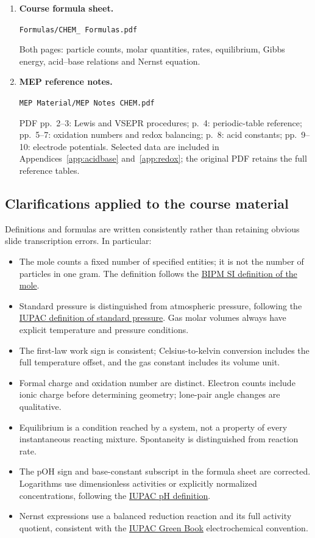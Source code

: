 \documentclass[a4paper,10pt]{article}
\begin{document}
\begin{enumerate}
  Theory on PDF pp.~5--8, 10--14 and 16--23; supports
  Sections~\ref{sec:reactions}--\ref{sec:equilibrium}. Exercise prompts and
  worked exercise tasks are omitted, including those sharing theory pages.
  \item \textbf{Course formula sheet.}\par
  \nolinkurl{Formulas/CHEM_ Formulas.pdf}\par
  Both pages: particle counts, molar quantities, rates, equilibrium, Gibbs energy,
  acid--base relations and Nernst equation.
  \item \textbf{MEP reference notes.}\par
  \nolinkurl{MEP Material/MEP Notes CHEM.pdf}\par
  PDF pp.~2--3: Lewis and VSEPR procedures; p.~4: periodic-table reference;
  pp.~5--7: oxidation numbers and redox balancing; p.~8: acid constants;
  pp.~9--10: electrode potentials. Selected data are included in
  Appendices~\ref{app:acidbase} and~\ref{app:redox}; the original PDF retains
  the full reference tables.
\end{enumerate}
\endgroup

\subsection*{Clarifications applied to the course material}
Definitions and formulas are written consistently rather than retaining obvious
slide transcription errors. In particular:
\begin{itemize}
  \item The mole counts a fixed number of specified entities; it is not the
  number of particles in one gram. The definition follows the
  \href{https://www.bipm.org/en/si-base-units/mole}{BIPM SI definition of the mole}.
  \item Standard pressure is distinguished from atmospheric pressure, following
  the \href{https://goldbook.iupac.org/terms/view/S05921}{IUPAC definition of standard pressure}.
  Gas molar volumes always have explicit temperature and pressure conditions.
  \item The first-law work sign is consistent; Celsius-to-kelvin conversion
  includes the full temperature offset, and the gas constant includes its volume unit.
  \item Formal charge and oxidation number are distinct. Electron counts include
  ionic charge before determining geometry; lone-pair angle changes are qualitative.
  \item Equilibrium is a condition reached by a system, not a property of every
  instantaneous reacting mixture. Spontaneity is distinguished from reaction rate.
  \item The pOH sign and base-constant subscript in the formula sheet are corrected.
  Logarithms use dimensionless activities or explicitly normalized concentrations,
  following the \href{https://goldbook.iupac.org/terms/view/P04524}{IUPAC pH definition}.
  \item Nernst expressions use a balanced reduction reaction and its full activity
  quotient, consistent with the
  \href{https://iupac.qmul.ac.uk/bibliog/GreenBook3rd2pt2008.pdf}{IUPAC Green Book}
  electrochemical convention.
\end{itemize}
\end{document}

